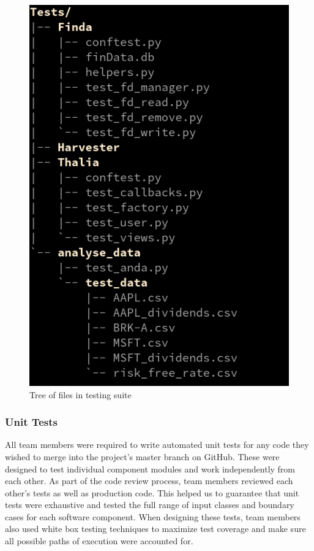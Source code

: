 \documentclass[main.tex]{subfiles}
\begin{document}
\begin{figure}[H]
   \centering
   \includegraphics[scale=0.3]{06Testing/06Pictures/testingSuiteStructure.png}
   \caption{Tree of files in testing suite}
   \label{Testing Suite}
\end{figure}

\subsubsection{Unit Tests}
All team members were required to write automated unit tests for any code they wished to merge into the project’s master branch on GitHub. These were designed to test individual component modules and work independently from each other. As part of the code review process, team members reviewed each other's tests as well as production code. This helped us to guarantee that unit tests were exhaustive and tested the full range of input classes and boundary cases for each software component. When designing these tests, team members also used white box testing techniques to maximize test coverage and make sure all possible paths of execution were accounted for.
\end{document}
